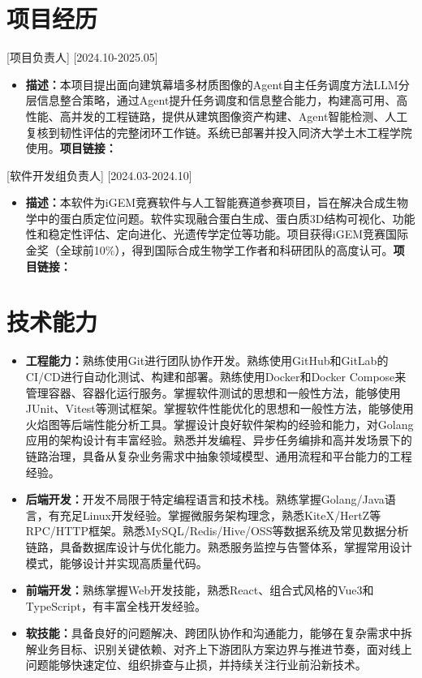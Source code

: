 \documentclass{style/template}
\begin{document}
\section{项目经历}

[项目负责人]
[2024.10-2025.05]
\begin{itemize}
    \item \textbf{描述：}本项目提出面向建筑幕墙多材质图像的Agent自主任务调度方法LLM分层信息整合策略，通过Agent提升任务调度和信息整合能力，构建高可用、高性能、高并发的工程链路，提供从建筑图像资产构建、Agent智能检测、人工复核到韧性评估的完整闭环工作链。系统已部署并投入同济大学土木工程学院使用。\textbf{项目链接：}
\end{itemize}

[软件开发组负责人]
[2024.03-2024.10]
\begin{itemize}
    \item \textbf{描述：}本软件为iGEM竞赛软件与人工智能赛道参赛项目，旨在解决合成生物学中的蛋白质定位问题。软件实现融合蛋白生成、蛋白质3D结构可视化、功能性和稳定性评估、定向进化、光遗传学定位等功能。项目获得iGEM竞赛国际金奖（全球前10\%），得到国际合成生物学工作者和科研团队的高度认可。\textbf{项目链接：}
\end{itemize}

\section{技术能力}

\begin{itemize}
    \item \textbf{工程能力：}熟练使用Git进行团队协作开发。熟练使用GitHub和GitLab的CI/CD进行自动化测试、构建和部署。熟练使用Docker和Docker Compose来管理容器、容器化运行服务。掌握软件测试的思想和一般性方法，能够使用JUnit、Vitest等测试框架。掌握软件性能优化的思想和一般性方法，能够使用火焰图等后端性能分析工具。掌握设计良好软件架构的经验和能力，对Golang应用的架构设计有丰富经验。熟悉并发编程、异步任务编排和高并发场景下的链路治理，具备从复杂业务需求中抽象领域模型、通用流程和平台能力的工程经验。
    \item \textbf{后端开发：}开发不局限于特定编程语言和技术栈。熟练掌握Golang/Java语言，有充足Linux开发经验。掌握微服务架构理念，熟悉KiteX/HertZ等RPC/HTTP框架。熟悉MySQL/Redis/Hive/OSS等数据系统及常见数据分析链路，具备数据库设计与优化能力。熟悉服务监控与告警体系，掌握常用设计模式，能够设计并实现高质量代码。
    \item \textbf{前端开发：}熟练掌握Web开发技能，熟悉React、组合式风格的Vue3和TypeScript，有丰富全栈开发经验。
    \item \textbf{软技能：}具备良好的问题解决、跨团队协作和沟通能力，能够在复杂需求中拆解业务目标、识别关键依赖、对齐上下游团队方案边界与推进节奏，面对线上问题能够快速定位、组织排查与止损，并持续关注行业前沿新技术。
\end{itemize}
\end{document}
